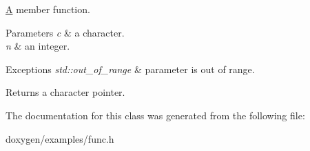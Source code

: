 \mbox{\hyperlink{class_a}{A}} member function. 


\begin{DoxyParams}{Parameters}
{\em c} & a character. \\
\hline
{\em n} & an integer. \\
\hline
\end{DoxyParams}

\begin{DoxyExceptions}{Exceptions}
{\em std\+::out\+\_\+of\+\_\+range} & parameter is out of range. \\
\hline
\end{DoxyExceptions}
\begin{DoxyReturn}{Returns}
a character pointer. 
\end{DoxyReturn}


The documentation for this class was generated from the following file\+:\begin{DoxyCompactItemize}
\item 
doxygen/examples/func.\+h\end{DoxyCompactItemize}
